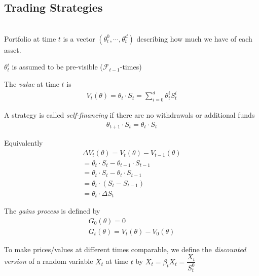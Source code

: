 \subsection{Trading Strategies}\hfill\\
\noindent Portfolio at time $t$ is a vector $(\theta_t^0,\cdots,\theta_t^d)$ describing how much we have of each asset.\par
\noindent $\theta_t^i$ is assumed to be pre-visible ($\mathcal{F}_{t-1}$-times)\par
\noindent The \textit{value} at time $t$ is
\begin{equation*}
  \begin{gathered}
    V_t(\theta) = \theta_t\cdot S_t = \sum_{i=0}^{d}\theta_t^iS_t^i
  \end{gathered}
\end{equation*}
\par\bigskip
\noindent A strategy is called \textit{self-financing} if there are no withdrawals or additional funds
\begin{equation*}
  \begin{gathered}
    \theta_{t+1}\cdot S_t = \theta_t\cdot S_t
  \end{gathered}
\end{equation*}\par
\noindent Equivalently
\begin{equation*}
  \begin{gathered}
    \Delta V_t(\theta) = V_t(\theta)-V_{t-1}(\theta)\\
    = \theta_t \cdot S_t - \theta_{t-1}\cdot S_{t-1}\\
    =\theta_t \cdot S_t - \theta_t \cdot S_{t-1}\\
    =\theta_t\cdot(S_t-S_{t-1})\\
    =\theta_t \cdot \Delta S_t
  \end{gathered}
\end{equation*}
\par\bigskip
\noindent The \textit{gains process} is defined by
\begin{equation*}
  \begin{gathered}
    G_0(\theta) = 0\\
    G_t(\theta) = V_t(\theta)-V_0(\theta)
  \end{gathered}
\end{equation*}\par
\noindent To make prices/values at different times comparable, we define the \textit{discounted version} of a random variable $X_t$ at time $t$ by $\overline{X}_t = \beta_t X_t = \dfrac{X_t}{S_t^0}$\par
